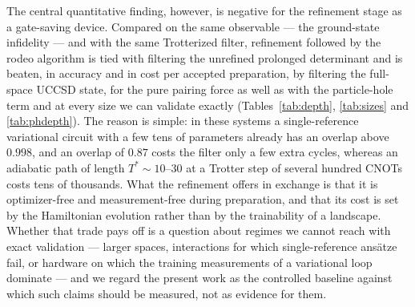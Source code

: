 \documentclass[
  aps,            %
  prc,            %
  reprint,        %
  superscriptaddress,
  floatfix,
  nofootinbib
]{revtex4-2}
\begin{document}
The central quantitative finding, however, is negative for the refinement
stage as a gate-saving device.  Compared on the same observable --- the
ground-state infidelity --- and with the same Trotterized filter, refinement
followed by the rodeo algorithm is tied with filtering the unrefined prolonged
determinant and is beaten, in accuracy and in cost per accepted preparation,
by filtering the full-space UCCSD state, for the pure pairing force as well as
with the particle-hole term and at every size we can validate exactly
(Tables~\ref{tab:depth}, \ref{tab:sizes} and \ref{tab:phdepth}).  The reason is
simple: in these systems a single-reference variational circuit with a few
tens of parameters already has an overlap above $0.998$, and an overlap of
$0.87$ costs the filter only a few extra cycles, whereas an adiabatic path of
length $T^{*}\sim10$--$30$ at a Trotter step of several hundred CNOTs costs
tens of thousands.  What the refinement offers in exchange is that it is
optimizer-free and measurement-free during preparation, and that its cost is
set by the Hamiltonian evolution rather than by the trainability of a
landscape.  Whether that trade pays off is a question about regimes we cannot
reach with exact validation --- larger spaces, interactions for which
single-reference ans\"atze fail, or hardware on which the training
measurements of a variational loop dominate --- and we regard the present
work as the controlled baseline against which such claims should be measured,
not as evidence for them.
\end{document}
